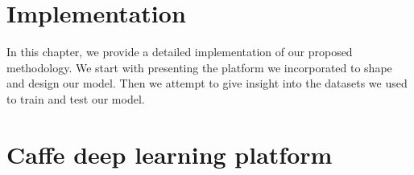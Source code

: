 
\section{Implementation}
\label{subsec:implementation}
\noindent

In this chapter, we provide a detailed implementation of our proposed methodology. We start with presenting the platform we incorporated to shape and design our model. Then we attempt to give insight into the datasets we used to train and test our model. 

\section{Caffe deep learning platform}
\cite{jia2014caffe}